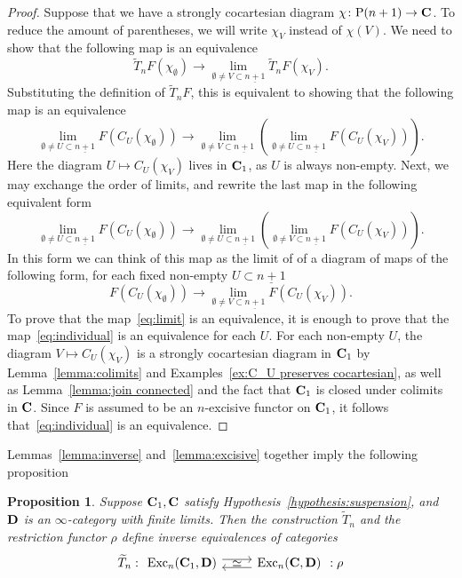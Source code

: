 \documentclass[psamsfonts]{amsart}
\theoremstyle{plain}
\newtheorem{prop}[thm]{Proposition}
\theoremstyle{definition}
\theoremstyle{remark}
\newcommand{\catname}[1]{{\normalfont\textbf{#1}}}
\newcommand{\power}{\mathrm{P}}
\DeclareMathOperator{\exc}{Exc}
\begin{document}
\begin{proof}
Suppose that we have a strongly cocartesian diagram $\chi\colon \power(n+1)\to \catname{C}$. To reduce the amount of parentheses, we will write $\chi_V$ instead of $\chi(V)$. We need to show that the following map is an equivalence
\[
\widetilde T_n F(\chi_\emptyset)\to \underset{\emptyset \ne V \subset \underline{n+1}}{\lim} \widetilde T_n F(\chi_V).
\]
Substituting the definition of $\widetilde T_n F$, this is equivalent to showing that the following map is an equivalence
\[
\underset{\emptyset \ne U\subset\underline{n+1}}{\lim}F(C_U(\chi_{\emptyset}))\to  \underset{\emptyset \ne V \subset \underline{n+1}}{\lim}\left(\underset{\emptyset \ne U\subset\underline{n+1}}{\lim} F(C_U(\chi_{V}))\right).
\]
Here the diagram $U\mapsto C_U(\chi_V)$ lives in $\catname{C}_1$, as $U$ is always non-empty. Next, we may exchange the order of limits, and rewrite the last map in the following equivalent form
\begin{equation}\label{eq:limit}
\underset{\emptyset \ne U\subset\underline{n+1}}{\lim}F(C_U(\chi_{\emptyset}))\to  \underset{\emptyset \ne U\subset \underline{n+1}}{\lim}\left(\underset{\emptyset \ne V\subset\underline{n+1}}{\lim} F(C_U(\chi_{V}))\right).
\end{equation}
In this form we can think of this map as the limit of of a diagram of maps of the following form, for each fixed non-empty $U\subset{\underline{n+1}}$
\begin{equation}\label{eq:individual}
F(C_U(\chi_{\emptyset}))\to  \underset{\emptyset \ne V\subset\underline{n+1}}{\lim} F(C_U(\chi_{V})).
\end{equation}
To prove that the map~\eqref{eq:limit} is an equivalence, it is enough to prove that the map~\eqref{eq:individual} is an equivalence for each $U$. For each non-empty $U$, the diagram $V\mapsto C_U(\chi_V)$ is a strongly cocartesian diagram in $\catname{C}_1$ by Lemma~\ref{lemma:colimits} and Examples~\ref{ex:C_U preserves cocartesian}, as well as Lemma~\ref{lemma:join connected} and the fact that $\catname{C}_1$ is closed under colimits in $\catname{C}$. Since $F$ is assumed to be an $n$-excisive functor on $\catname{C}_1$, it follows that~\eqref{eq:individual} is an equivalence.
\end{proof}
Lemmas~\ref{lemma:inverse} and~\ref{lemma:excisive} together imply the following proposition
\begin{prop}\label{prop:inverse}
Suppose $\catname{C}_1, \catname{C}$ satisfy Hypothesis~\ref{hypothesis:suspension}, and $\catname{D}$ is an $\infty$-category with finite limits. Then the construction $\widetilde T_n$ and the restriction functor $\rho$ define inverse equivalences of categories
\[
\widetilde T_n : \begin{tikzcd}
           \exc_n(\catname{C}_1, \catname{D})
           \arrow[r, shift left=.75ex]
            \arrow[r, phantom, "\simeq"] 
           &  \exc_n(\catname{C}, \catname{D})
           \arrow[l, shift left=.75ex]      
        \end{tikzcd}  : \rho
\]
\end{prop}
\end{document}
